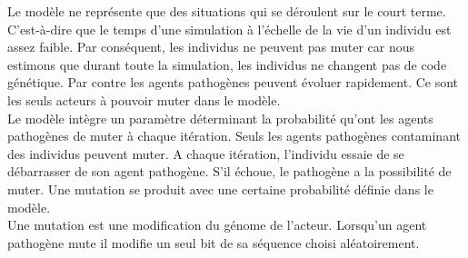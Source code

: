 Le modèle ne représente que des situations qui se déroulent sur le court terme. C'est-à-dire que le temps d'une simulation à l'échelle de la vie d'un individu est assez faible. Par conséquent, les individus ne peuvent pas muter car nous estimons que durant toute la simulation, les individus ne changent pas de code génétique. Par contre les agents pathogènes peuvent évoluer rapidement. Ce sont les seuls acteurs à pouvoir muter dans le modèle.\\

Le modèle intègre un paramètre déterminant la probabilité qu'ont les agents pathogènes de muter à chaque itération. Seuls les agents pathogènes contaminant des individus peuvent muter. A chaque itération, l'individu essaie de se débarrasser de son agent pathogène. S'il échoue, le pathogène a la possibilité de muter. Une mutation se produit avec une certaine probabilité définie dans le modèle.\\

Une mutation est une modification du génome de l'acteur. Lorsqu'un agent pathogène mute il modifie un seul bit de sa séquence choisi aléatoirement. 